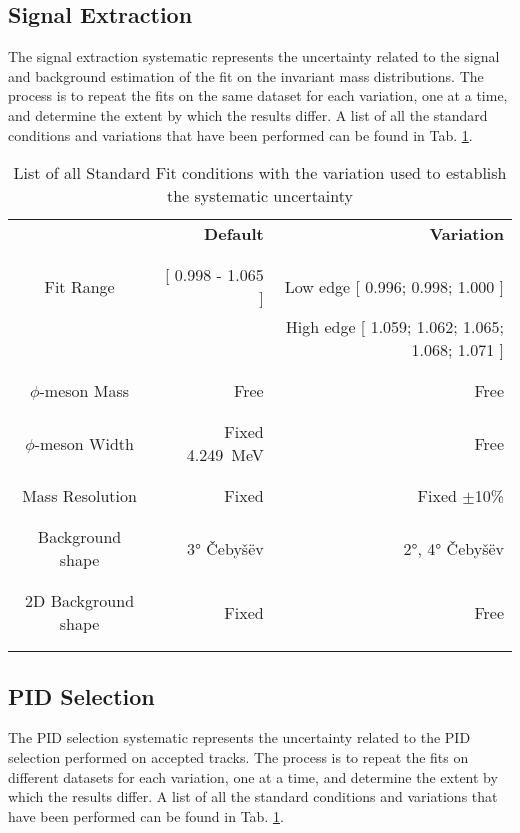 \subsection{Signal Extraction}
The signal extraction systematic represents the uncertainty related to the signal and background estimation of the fit on the invariant mass distributions. The process is to repeat the fits on the same dataset for each variation, one at a time, and determine the extent by which the results differ. A list of all the standard conditions and variations that have been performed can be found in Tab. \ref{tab:Syst_SE}.
\begin{table}[h]
\center
\begin{tabular}{c|r|r}
					&\textbf{Default}							&\textbf{Variation}		\\
					\\ \hline \\
Fit Range				&[ 0.998 - 1.065 ]							& Low edge  [ 0.996; 0.998; 1.000 ]\\
					&										& High edge [ 1.059; 1.062; 1.065; 1.068; 1.071  ]\\
					\\ \hline \\
$\phi$-meson Mass		&Free									&Free\\
					\\ \hline \\
$\phi$-meson Width		&Fixed \SI{4.249}{\mega\electronvolt}\cite{PDG}	&Free\\
					\\ \hline \\
Mass Resolution		&Fixed									&Fixed $\pm$10\%\\
					\\ \hline \\
Background shape		&3° \v{C}eby\v{s}\"{e}v 						&2°, 4° \v{C}eby\v{s}\"{e}v \\
					\\ \hline \\
2D Background shape	&Fixed									&Free\\
					\\ \hline \\

\end{tabular}
\caption{List of all Standard Fit conditions with the variation used to establish the systematic uncertainty}
\label{tab:Syst_SE}
\end{table}

\subsection{PID Selection}
The PID selection systematic represents the uncertainty related to the PID selection performed on accepted tracks. The process is to repeat the fits on different datasets for each variation, one at a time, and determine the extent by which the results differ. A list of all the standard conditions and variations that have been performed can be found in Tab. \ref{tab:Syst_SE}.

